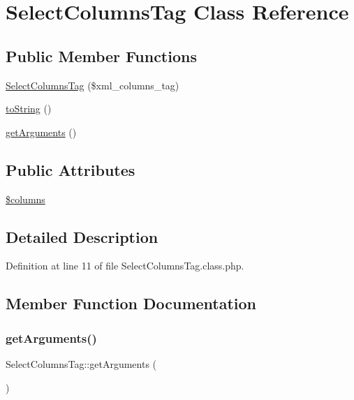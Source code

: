 \hypertarget{classSelectColumnsTag}{}\section{Select\+Columns\+Tag Class Reference}
\label{classSelectColumnsTag}
\subsection*{Public Member Functions}
\begin{DoxyCompactItemize}
\item 
\hyperlink{classSelectColumnsTag_a272d801d4a575217cd168a99bc7648a7}{Select\+Columns\+Tag} (\$xml\+\_\+columns\+\_\+tag)
\item 
\hyperlink{classSelectColumnsTag_a5780a3688343fd43d59071e966a64bef}{to\+String} ()
\item 
\hyperlink{classSelectColumnsTag_a2de673a98250ed2724826d5530113541}{get\+Arguments} ()
\end{DoxyCompactItemize}
\subsection*{Public Attributes}
\begin{DoxyCompactItemize}
\item 
\hyperlink{classSelectColumnsTag_a71af778e3ff63eedcd1c9db93274aeae}{\$columns}
\end{DoxyCompactItemize}


\subsection{Detailed Description}


Definition at line 11 of file Select\+Columns\+Tag.\+class.\+php.



\subsection{Member Function Documentation}
\hypertarget{classSelectColumnsTag_a2de673a98250ed2724826d5530113541}{}\label{classSelectColumnsTag_a2de673a98250ed2724826d5530113541} 
\subsubsection{\texorpdfstring{get\+Arguments()}{getArguments()}}
{\footnotesize\ttfamily Select\+Columns\+Tag\+::get\+Arguments (\begin{DoxyParamCaption}{ }\end{DoxyParamCaption})}

